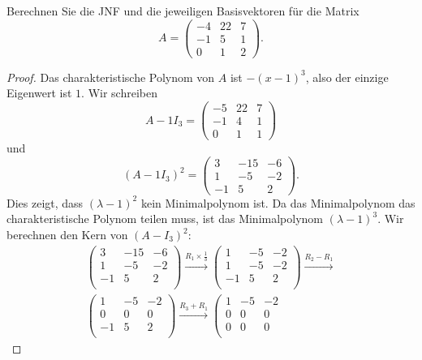 \begin{Problem}
Berechnen Sie die JNF und die jeweiligen Basisvektoren für die Matrix	
\[
	A=\begin{pmatrix} -4 & 22 & 7 \\ -1 & 5 & 1 \\ 0 & 1 & 2 \end{pmatrix} 
.\] 
\end{Problem}
\begin{proof}
	Das charakteristische Polynom von $A$ ist $-(x-1)^3$, also der einzige Eigenwert ist $1$. Wir schreiben
	\[
		A-1I_3=\begin{pmatrix} -5 & 22 & 7 \\ -1 & 4 & 1 \\ 0 & 1 & 1 \end{pmatrix} 
	\]
	und
	\[
		(A-1I_3)^2=\begin{pmatrix} 3 & -15 & -6 \\ 1 & -5 & -2 \\ -1 & 5 & 2 \end{pmatrix} 
	.\] 
	Dies zeigt, dass $(\lambda-1)^2$ kein Minimalpolynom ist. Da das Minimalpolynom das charakteristische Polynom teilen muss, ist das Minimalpolynom $(\lambda-1)^3$. Wir berechnen den Kern von $(A-I_3)^2$:
	\begin{gather*}
	\left(
\begin{array}{ccc}
 3 & -15 & -6 \\
 1 & -5 & -2 \\
 -1 & 5 & 2 \\
\end{array}
\right) \xrightarrow{R_1\times \frac{1}{3}} \left(
\begin{array}{ccc}
 1 & -5 & -2 \\
 1 & -5 & -2 \\
 -1 & 5 & 2 \\
\end{array}
\right) \xrightarrow{R_2-R_1}\\ \left(
\begin{array}{ccc}
 1 & -5 & -2 \\
 0 & 0 & 0 \\
 -1 & 5 & 2 \\
\end{array}
\right) \xrightarrow{R_3+R_1} \left(
\begin{array}{ccc}
 1 & -5 & -2 \\
 0 & 0 & 0 \\
 0 & 0 & 0 \\
\end{array}

\end{gather*}
\end{proof}
